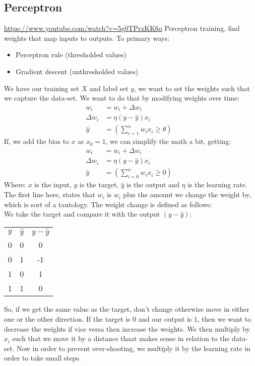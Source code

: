     \subsection{Perceptron}
    \url{https://www.youtube.com/watch?v=5g0TPrxKK6o}
    Perceptron training, find weights that map inputs to outputs. To primary 
    ways:
    \begin{itemize}
        \item Perceptron rule (thresholded values)
        \item Gradient descent (unthresholded values)
    \end{itemize}
    We have our training set $X$ and label set $y$, we want to set the weights 
    such that we capture the data-set. We want to do that by modifying weights 
    over time:
    \begin{align*}
        w_i &= w_i + \Delta w_i\\
        \Delta w_i &= \eta(y-\hat{y})x_i\\
        \hat{y} &= (\sum_{i=1}^n w_ix_i \geq \theta)
    \end{align*}
    If, we add the bias to $x$ as $x_0=1$, we can simplify the math a bit, 
    getting:
    \begin{align*}
    w_i &= w_i + \Delta w_i\\
    \Delta w_i &= \eta(y-\hat{y})x_i\\
    \hat{y} &= (\sum_{i=0}^n w_ix_i \geq 0)
    \end{align*}
    Where: $x$ is the input, $y$ is the target, $\hat{y}$ is the output and 
    $\eta$ 
    is the learning rate.\\
    The first line here, states that $w_i$ is $w_i$ plus the amount we change 
    the weight by, which is sort of a tautology. The weight change is defined 
    as follows:\\
    We take the target and compare it with the output $(y-\hat{y})$:
    \begin{table}
        \centering
        \begin{tabular}{c c c}
            $y$ & $\hat{y}$ & $y-\hat{y}$\\
            0 & 0 & 0\\
            0 & 1 & -1\\
            1 & 0 & 1\\
            1 & 1 & 0
        \end{tabular}
    \end{table}
    So, if we get the same value as the target, don't change otherwise move in 
    either one or the other direction. If the target is $0$ and our output is 
    $1$, then we want to decrease the weights if vice versa then increase the 
    weights. We then multiply by $x_i$ such that we move it by a distance thaat 
    makes sense in relation to the data-set. Now in order to prevent 
    over-shooting, we multiply it by the learning rate in order to take small 
    steps.
    
